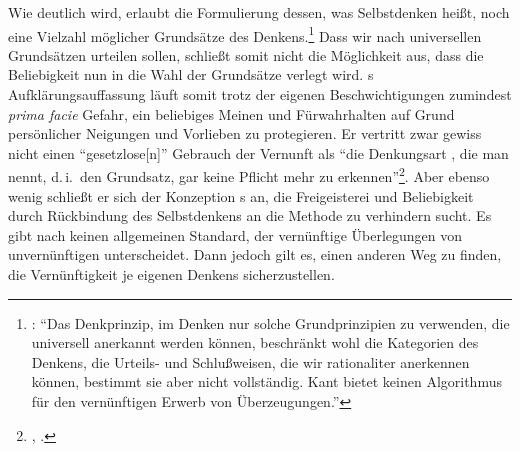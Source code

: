 Wie deutlich wird, erlaubt die Formulierung dessen, was Selbstdenken heißt, noch
eine Vielzahl möglicher Grundsätze des
Denkens.\footnote{\cite[Vgl.][224]{ONeill:AufgeklaerteVernunft1996}:
\enquote{Das Denkprinzip, im Denken nur solche Grundprinzipien zu verwenden, die
universell anerkannt werden können, beschränkt wohl die Kategorien des Denkens,
die Urteils- und Schlußweisen, die wir rationaliter anerkennen können, bestimmt
sie aber nicht vollständig. Kant bietet keinen Algorithmus für den vernünftigen
Erwerb von Überzeugungen.}} Dass wir nach universellen Grundsätzen urteilen
sollen, schließt somit nicht die Möglichkeit aus, dass die Beliebigkeit nun in
die Wahl der Grundsätze verlegt wird. s
Aufklärungsauffassung läuft somit trotz der eigenen Beschwichtigungen zumindest
\emph{prima facie} Gefahr, ein beliebiges Meinen und Fürwahrhalten auf Grund
persönlicher Neigungen und Vorlieben zu protegieren.
Er vertritt zwar gewiss nicht einen \enquote{gesetzlose[n]} Gebrauch
der Vernunft als \enquote{die Denkungsart \punkt , die man 
nennt, d.\,i.\ den Grundsatz, gar keine Pflicht mehr zu
erkennen}\footnote{\cite[][A 328]{Kant:Washeisst:SichimDenkenorientieren?1977},
\cite[][VIII: 146.15--16]{Kant:GesammelteWerke1900ff.}.}. Aber ebenso wenig
schließt er sich der Konzeption
s an, die
Freigeisterei und Beliebigkeit durch Rückbindung des Selbstdenkens an die
 Methode zu verhindern sucht. Es gibt nach 
keinen allgemeinen Standard, der vernünftige Überlegungen von unvernünftigen
unterscheidet. Dann jedoch gilt es, einen anderen Weg zu finden, die
Vernünftigkeit je eigenen Denkens sicherzustellen.


